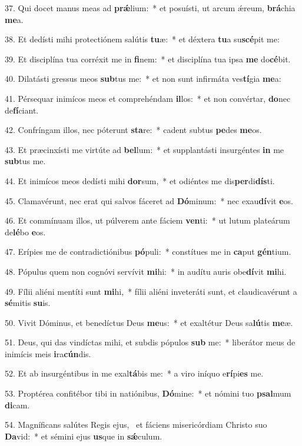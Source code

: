 37. Qui docet manus meas ad \textbf{prǽ}lium:~*  et posuísti, ut arcum ǽreum, \textbf{brá}chia \textbf{me}a.\

38. Et dedísti mihi protectiónem salútis \textbf{tu}æ:~*  et déxtera \textbf{tu}a su\textbf{scé}pit me:\

39. Et disciplína tua corréxit me in \textbf{fi}nem:~*  et disciplína tua ipsa \textbf{me} do\textbf{cé}bit.\

40. Dilatásti gressus meos \textbf{sub}tus me:~*  et non sunt infirmáta ves\textbf{tí}gia \textbf{me}a:\

41. Pérsequar inimícos meos et comprehéndam \textbf{il}los:~*  et non convértar, \textbf{do}nec de\textbf{fí}ciant.\

42. Confríngam illos, nec póterunt \textbf{sta}re:~*  cadent subtus \textbf{pe}des \textbf{me}os.\

43. Et præcinxísti me virtúte ad \textbf{bel}lum:~*  et supplantásti insurgéntes \textbf{in} me \textbf{sub}tus me.\

44. Et inimícos meos dedísti mihi \textbf{dor}sum,~*  et odiéntes me dis\textbf{per}di\textbf{dís}ti.\

45. Clamavérunt, nec erat qui salvos fáceret ad \textbf{Dó}minum:~*  nec exau\textbf{dí}vit \textbf{e}os.\

46. Et commínuam illos, ut púlverem ante fáciem \textbf{ven}ti:~*  ut lutum plateárum de\textbf{lé}bo \textbf{e}os.\

47. Erípies me de contradictiónibus \textbf{pó}puli:~*  constítues me in \textbf{ca}put \textbf{gén}tium.\

48. Pópulus quem non cognóvi servívit \textbf{mi}hi:~*  in audítu auris obe\textbf{dí}vit \textbf{mi}hi.\

49. Fílii aliéni mentíti sunt \textbf{mi}hi,~*  fílii aliéni inveteráti sunt, et claudicavérunt a \textbf{sé}mitis \textbf{su}is.\

50. Vivit Dóminus, et benedíctus Deus \textbf{me}us:~*  et exaltétur Deus sa\textbf{lú}tis \textbf{me}æ.\

51. Deus, qui das vindíctas mihi, et subdis pópulos \textbf{sub} me:~*  liberátor meus de inimícis meis \textbf{i}ra\textbf{cún}dis.\

52. Et ab insurgéntibus in me exal\textbf{tá}bis me:~*  a viro iníquo e\textbf{rí}pi\textbf{es} me.\

53. Proptérea confitébor tibi in natiónibus, \textbf{Dó}mine:~*  et nómini tuo \textbf{psal}mum \textbf{di}cam.\

54. Magníficans salútes Regis ejus, \dag\  et fáciens misericórdiam Christo suo \textbf{Da}vid:~*  et sémini ejus \textbf{us}que in \textbf{sǽ}culum.\

